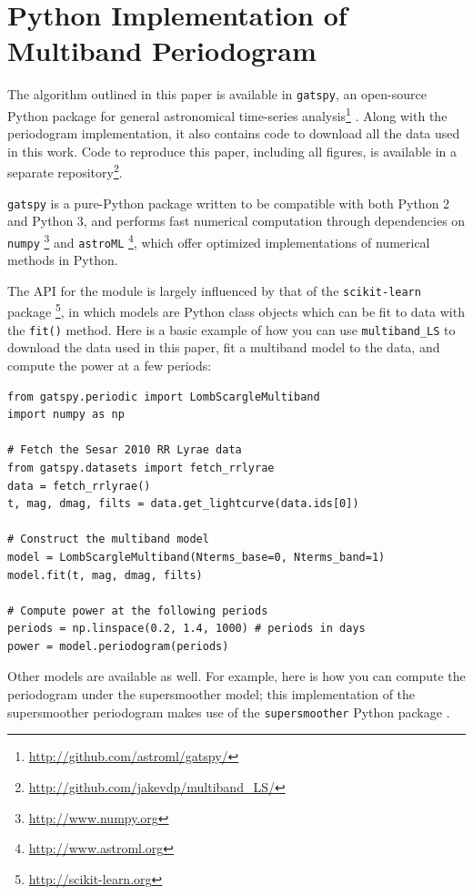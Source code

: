 \documentclass{emulateapj}
\newcommand{\sectlabel}[1]{\label{sect:#1}}
\begin{document}



\appendix
\section{Python Implementation of Multiband Periodogram}
\sectlabel{gatspy}
The algorithm outlined in this paper is available in {\tt gatspy}, an open-source Python package for general astronomical time-series analysis\footnote{\url{http://github.com/astroml/gatspy/}} \citep{gatspy}. Along with the periodogram implementation, it also contains code to download all the data used in this work. Code to reproduce this paper, including all figures, is available in a separate repository\footnote{\url{http://github.com/jakevdp/multiband\_LS/}}.

{\tt gatspy} is a pure-Python package written to be compatible with both Python 2 and Python 3, and performs fast numerical computation through dependencies on {\tt numpy} \citep{numpy}\footnote{\url{http://www.numpy.org}} and {\tt astroML} \citep{astroML}\footnote{\url{http://www.astroml.org}}, which offer optimized implementations of numerical methods in Python.

The API for the module is largely influenced by that of the {\tt scikit-learn} package \citep{scikit-learn, sklearn_API}\footnote{\url{http://scikit-learn.org}}, in which models are Python class objects which can be fit to data with the \texttt{fit()} method.
Here is a basic example of how you can use {\tt multiband\_LS} to download the data used in this paper, fit a multiband model to the data, and compute the power at a few periods:

\begin{lstlisting}
from gatspy.periodic import LombScargleMultiband
import numpy as np

# Fetch the Sesar 2010 RR Lyrae data
from gatspy.datasets import fetch_rrlyrae
data = fetch_rrlyrae()
t, mag, dmag, filts = data.get_lightcurve(data.ids[0])

# Construct the multiband model
model = LombScargleMultiband(Nterms_base=0, Nterms_band=1)
model.fit(t, mag, dmag, filts)

# Compute power at the following periods
periods = np.linspace(0.2, 1.4, 1000) # periods in days
power = model.periodogram(periods)
\end{lstlisting}

Other models are available as well. For example, here is how you can compute the periodogram under the supersmoother model; this implementation of the supersmoother periodogram makes use of the \texttt{supersmoother} Python package \citep{Vanderplas2015}.
\end{document}
